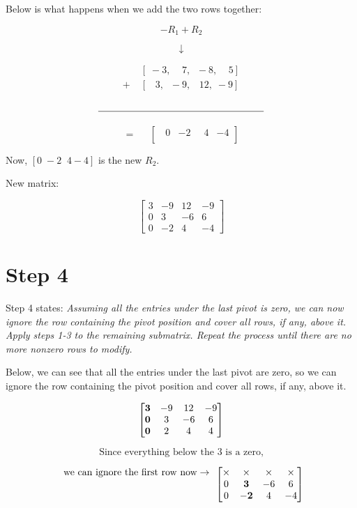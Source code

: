 \documentclass[
  letterpaper,
  DIV=11,
  numbers=noendperiod]{scrreprt}
\begin{document}
Below is what happens when we add the two rows together:

\[
-R_1 + R_2
\]

\[
\downarrow
\]

\[
\begin{array}{cc}
    &\left[\;-3,  \;\;\;\;7, \;\; -8, \;\;\;\; 5 \right] \\
    +\; &\left[ \;\;\;3, \;\; -9, \;\;\;12, \; -9 \right]
\end{array}
\]

\[
\rule{6cm}{0.4pt}
\]

\[
=\;\;\;\;\;\begin{bmatrix}
    \;\;0 & -2 & \;\;4 & -4 \\
\end{bmatrix}
\]

Now, \(\left[0 \; -2 \;\; 4 -4 \right]\) is the new \(R_2\).

New matrix:

\[
\begin{bmatrix}
    3 & -9 & 12 & -9 \\
    0 & 3 & -6 & 6 \\
    0 & -2 & 4 & -4
\end{bmatrix}
\]

\chapter{Step 4}

Step 4 states: \emph{Assuming all the entries under the last pivot is
zero, we can now ignore the row containing the pivot position and cover
all rows, if any, above it. Apply steps 1-3 to the remaining submatrix.
Repeat the process until there are no more nonzero rows to modify.}

Below, we can see that all the entries under the last pivot are zero, so
we can ignore the row containing the pivot position and cover all rows,
if any, above it.

\[
\begin{bmatrix}
    \bf{3} & -9 & 12 & -9 \\
    \bf{0} & 3 & -6 & 6 \\
    \bf{0} & 2 & 4 & 4
\end{bmatrix}
\]

\[
\text{Since everything below the 3 is a zero,}
\]

\[
\begin{array}{c}
    \text{we can ignore the first row now} \rightarrow \\
                                \\
                                \\
\end{array}
\begin{bmatrix}
    \times & \times & \times & \times \\
    0 & \bf{3} & -6 & 6 \\
    0 & \bf{-2} & 4 & -4
\end{bmatrix}
\]
\end{document}
